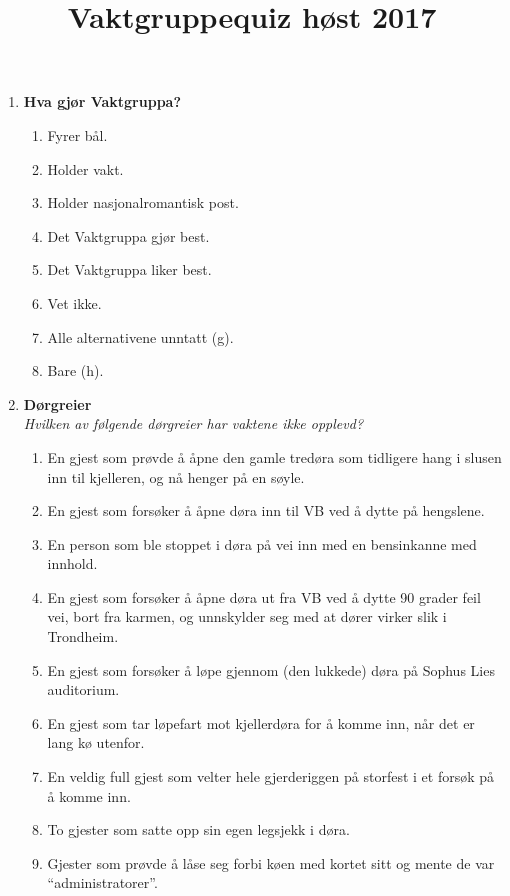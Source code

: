 \documentclass[11pt]{article}
\begin{document}
\title{Vaktgruppequiz høst 2017}
\date{}
\maketitle
\vspace{-1cm}
\begin{enumerate}
\item \textbf{Hva gjør Vaktgruppa?}
    \begin{enumerate}
        \item Fyrer bål.
        \item Holder vakt.
        \item Holder nasjonalromantisk post.
        \item Det Vaktgruppa gjør best.
        \item Det Vaktgruppa liker best.
        \item Vet ikke. 
        \item Alle alternativene unntatt (g).
        \item Bare (h).
    \end{enumerate}
\item \textbf{Dørgreier} \vspace{1mm}\\
\textit{Hvilken av følgende dørgreier har vaktene ikke opplevd?}
    \begin{enumerate}
\item En gjest som prøvde å åpne den gamle tredøra som tidligere hang i slusen inn til kjelleren, og nå henger på en søyle.
\item En gjest som forsøker å åpne døra inn til VB ved å dytte på hengslene.
\item En person som ble stoppet i døra på vei inn med en bensinkanne med innhold.
\item En gjest som forsøker å åpne døra ut fra VB ved å dytte 90 grader feil vei, bort fra karmen, og unnskylder seg med at dører virker slik i Trondheim.
\item En gjest som forsøker å løpe gjennom (den lukkede) døra på Sophus Lies auditorium.
\item En gjest som tar løpefart mot kjellerdøra for å komme inn, når det er lang kø utenfor.
\item En veldig full gjest som velter hele gjerderiggen på storfest i et forsøk på å komme inn. \item To gjester som satte opp sin egen legsjekk i døra.
\item Gjester som prøvde å låse seg forbi køen med kortet sitt og mente de var ``administratorer''.

\end{enumerate}
\end{enumerate}
\end{document}
